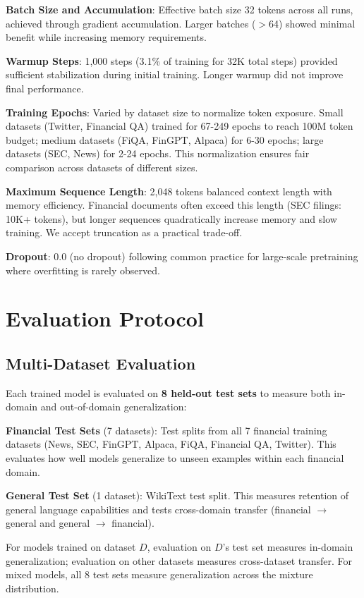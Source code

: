 \textbf{Batch Size and Accumulation}: Effective batch size 32 tokens across all runs, achieved through gradient accumulation. Larger batches ($>$64) showed minimal benefit while increasing memory requirements.

\textbf{Warmup Steps}: 1,000 steps (3.1\% of training for 32K total steps) provided sufficient stabilization during initial training. Longer warmup did not improve final performance.

\textbf{Training Epochs}: Varied by dataset size to normalize token exposure. Small datasets (Twitter, Financial QA) trained for 67-249 epochs to reach 100M token budget; medium datasets (FiQA, FinGPT, Alpaca) for 6-30 epochs; large datasets (SEC, News) for 2-24 epochs. This normalization ensures fair comparison across datasets of different sizes.

\textbf{Maximum Sequence Length}: 2,048 tokens balanced context length with memory efficiency. Financial documents often exceed this length (SEC filings: 10K+ tokens), but longer sequences quadratically increase memory and slow training. We accept truncation as a practical trade-off.

\textbf{Dropout}: 0.0 (no dropout) following common practice for large-scale pretraining where overfitting is rarely observed.

\section{Evaluation Protocol}

\subsection{Multi-Dataset Evaluation}

Each trained model is evaluated on \textbf{8 held-out test sets} to measure both in-domain and out-of-domain generalization:

\textbf{Financial Test Sets} (7 datasets): Test splits from all 7 financial training datasets (News, SEC, FinGPT, Alpaca, FiQA, Financial QA, Twitter). This evaluates how well models generalize to unseen examples within each financial domain.

\textbf{General Test Set} (1 dataset): WikiText test split. This measures retention of general language capabilities and tests cross-domain transfer (financial $\to$ general and general $\to$ financial).

For models trained on dataset $D$, evaluation on $D$'s test set measures in-domain generalization; evaluation on other datasets measures cross-dataset transfer. For mixed models, all 8 test sets measure generalization across the mixture distribution.

